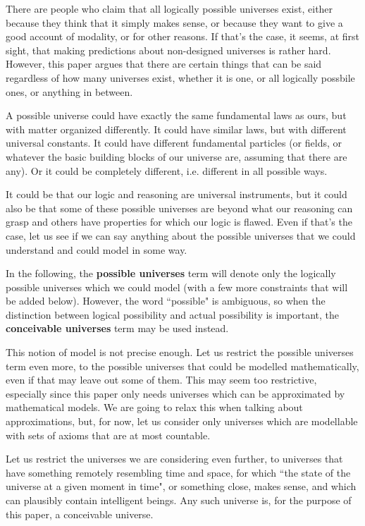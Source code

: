\documentclass[a4paper
,draft
]{article}
\newcommand{\paper}[1]{paper}
\newcommand{\definitie}[1]{\textbf{#1}}
\newcommand{\ghilimele}[1]{``#1"}
\begin{document}
There are people who claim that all logically possible universes exist,
either because they think that it simply makes sense, or because they want to
give a good account of modality, or for other reasons.
If that's the case, it seems, at first sight, that making predictions about
non-designed universes is rather hard.
However, this \paper{} argues that there are certain things that can be said
regardless of how many universes exist, whether it is one, or all logically
possbile ones, or anything in between.

A possible universe
could have exactly the same fundamental laws as ours, but with matter
organized differently.
It could have similar laws, but with different universal constants.
It could have different fundamental particles (or fields, or whatever the basic
building blocks of our universe are, assuming that there are any).
Or it could be completely different, i.e. different in all possible ways.

It could be that our logic and reasoning are universal instruments,
but it could also be that some of these possible universes are
beyond what our reasoning can grasp and others have properties
for which our logic is flawed.
Even if that's the case, let us see if we can say anything about
the possible universes that we could understand and could model in some way.

In the following, the \definitie{possible universes} term will denote
only the logically possible universes which we could model (with a few
more constraints that will be added below). However, the word
\ghilimele{possible} is ambiguous, so when the distinction between logical
possibility and actual possibility is important, the
\definitie{conceivable universes} term may be used instead.

This notion of model is not precise enough.
Let us restrict the possible universes term even more,
to the possible universes that could be modelled mathematically,
even if that may leave out some of them.
This may seem too restrictive,
especially since this paper only needs universes which can be approximated
by mathematical models.
We are going to relax this when talking about approximations, but, for now,
let us consider only universes
which are modellable with sets of axioms that are at most countable.

Let us restrict the universes we are considering even further, to universes that
have something remotely resembling time and space, for which
\ghilimele{the state of the universe at a given moment in time}, or something
close, makes sense, and which can plausibly contain intelligent beings.
Any such universe is, for the purpose of this paper, a conceivable universe.
\end{document}
